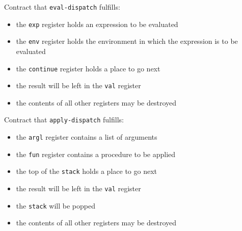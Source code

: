 \documentclass[a4paper,twoside]{article}
\numberwithin{equation}{section}
\begin{document}
Contract that \texttt{eval-dispatch} fulfills:
\begin{itemize}
\item the \texttt{exp} register holds an expression to be evaluated
\item the \texttt{env} register holds the environment in which the expression is to be evaluated
\item the \texttt{continue} register holds a place to go next
\item the result will be left in the \texttt{val} register
\item the contents of all other registers may be destroyed
\end{itemize}

Contract that \texttt{apply-dispatch} fulfills:
\begin{itemize}
\item the \texttt{argl} register contains a list of arguments
\item the \texttt{fun} register contains a procedure to be applied
\item the top of the \texttt{stack} holds a place to go next
\item the result will be left in the \texttt{val} register
\item the \texttt{stack} will be popped
\item the contents of all other registers may be destroyed
\end{itemize}
\end{document}
